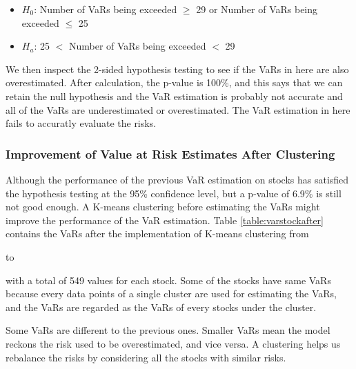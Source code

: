 \documentclass[11pt]{article} %
\theoremstyle{plain}
\theoremstyle{definition}
\begin{document}
\begin{itemize}
    \item \textsl{$H_0$}: Number of VaRs being exceeded $\geq$ 29 or Number of VaRs being exceeded $\leq$ 25
    \item \textsl{$H_a$}: 25 $<$ Number of VaRs being exceeded $<$ 29
\end{itemize}

We then inspect the 2-sided hypothesis testing to see if the VaRs in here are also overestimated. After calculation, the p-value is 100\%, and this says that we can retain the null hypothesis and the VaR estimation is probably not accurate and all of the VaRs are underestimated or overestimated. The VaR estimation in here fails to accuratly evaluate the risks.

\subsubsection{Improvement of Value at Risk Estimates After Clustering}

Although the performance of the previous VaR estimation on stocks has satisfied the hypothesis testing at the 95\% confidence level, but a p-value of 6.9\% is still not good enough. A K-means clustering before estimating the VaRs might improve the performance of the VaR estimation. Table \ref{table:varstockafter} contains the VaRs after the implementation of K-means clustering from \date{26th May 2016} to \date{31st July 2018} with a total of 549 values for each stock. Some of the stocks have same VaRs because every data points of a single cluster are used for estimating the VaRs, and the VaRs are regarded as the VaRs of every stocks under the cluster.

Some VaRs are different to the previous ones. Smaller VaRs mean the model reckons the risk used to be overestimated, and vice versa. A clustering helps us rebalance the risks by considering all the stocks with similar risks.
\end{document}
